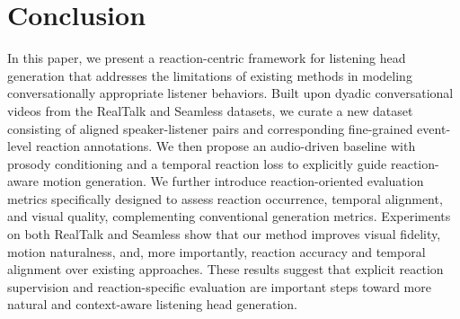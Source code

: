 \vspace{-0.5em}
\section{Conclusion}
\vspace{-0.5em}

In this paper, we present a reaction-centric framework for listening head generation that addresses the limitations of existing methods in modeling conversationally appropriate listener behaviors. Built upon dyadic conversational videos from the RealTalk and Seamless datasets, we curate a new dataset consisting of aligned speaker-listener pairs and corresponding fine-grained event-level reaction annotations. We then propose an audio-driven baseline with prosody conditioning and a temporal reaction loss to explicitly guide reaction-aware motion generation. We further introduce reaction-oriented evaluation metrics specifically designed to assess reaction occurrence, temporal alignment, and visual quality, complementing conventional generation metrics. Experiments on both RealTalk and Seamless show that our method improves visual fidelity, motion naturalness, and, more importantly, reaction accuracy and temporal alignment over existing approaches. These results suggest that explicit reaction supervision and reaction-specific evaluation are important steps toward more natural and context-aware listening head generation.

